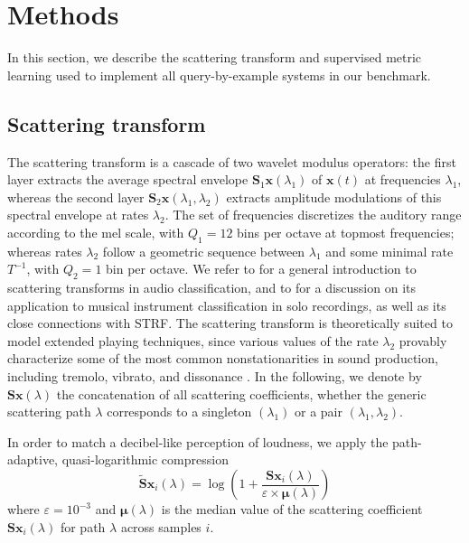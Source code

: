 \documentclass{article}
\begin{document}


\section{Methods}

In this section, we describe the scattering transform and supervised metric learning used to implement all query-by-example systems in our benchmark.

\subsection{Scattering transform} %
The scattering transform is a cascade of two wavelet modulus operators:
the first layer extracts the average spectral envelope $\mathbf{S}_1 \boldsymbol{x} (\lambda_1)$ of $\boldsymbol{x}(t)$ at frequencies $\lambda_1$, whereas the second layer $\mathbf{S}_2 \boldsymbol{x} (\lambda_1, \lambda_2)$ extracts amplitude modulations of this spectral envelope at rates $\lambda_2$.
The set of frequencies discretizes the auditory range according to the mel scale, with $Q_1 = 12$ bins per octave at topmost frequencies; whereas rates $\lambda_2$ follow a geometric sequence between $\lambda_1$ and some minimal rate $T^{-1}$, with $Q_2 = 1$ bin per octave.
We refer to \cite{anden2014taslp} for a general introduction to scattering transforms in audio classification, and to \cite{lostanlen2017phd} for a discussion on its application to musical instrument classification in solo recordings, as well as its close connections with STRF. The scattering transform is theoretically suited to model extended playing techniques, since various values of the rate $\lambda_2$ provably characterize some of the most common nonstationarities in sound production, including tremolo, vibrato, and dissonance \cite{anden2012dafx}.
In the following, we denote by $\mathbf{S}\boldsymbol{x}(\lambda)$ the concatenation of all scattering coefficients, whether the generic scattering path $\lambda$ corresponds to a singleton $(\lambda_1)$ or a pair $(\lambda_1,\lambda_2)$.

In order to match a decibel-like perception of loudness, we apply the path-adaptive, quasi-logarithmic compression
\begin{equation}
\widetilde{\mathbf{S}} \boldsymbol{x}_i(\lambda) =
\log \left(
1 + \dfrac{\mathbf{S}\boldsymbol{x}_i(\lambda)}{\varepsilon \times \boldsymbol{\mu}(\lambda)}
\right)
\end{equation}
where $\varepsilon = 10^{-3}$ and $\boldsymbol{\mu}(\lambda)$ is the median value of the scattering coefficient $\mathbf{S}\boldsymbol{x}_i (\lambda)$ for path $\lambda$ across samples $i$.
\end{document}
